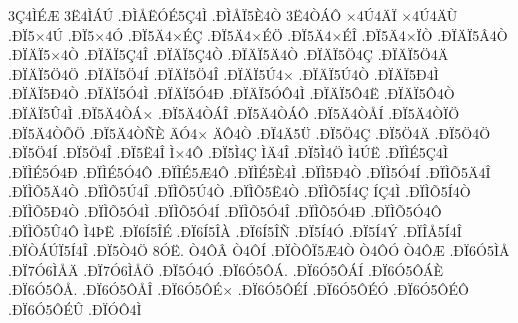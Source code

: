 {3^^c74^^cc^^c9^^c6
3^^cb4^^cc^^c1^^da
.^^d0^^cc^^c5^^cb^^d3^^c95^^c74^^cc
.^^d0^^cc^^c5^^cf5^^c84^^d2
3^^cb4^^d2^^c1^^d4
^^d74^^da4^^c4^^cf
^^d74^^da4^^c4^^d9
.^^d0^^cf5^^d74^^da
.^^d0^^cf5^^d74^^d3
.^^d0^^cf5^^c44^^d7^^c9^^c7
.^^d0^^cf5^^c44^^d7^^c9^^d6
.^^d0^^cf5^^c44^^d7^^c9^^ce
.^^d0^^cf5^^c44^^d7^^cf^^d2
.^^d0^^cf^^c4^^cf5^^c24^^d2
.^^d0^^cf^^c4^^cf5^^d74^^d2
.^^d0^^cf^^c4^^cf5^^c74^^ce
.^^d0^^cf^^c4^^cf5^^c74^^d2
.^^d0^^cf^^c4^^cf5^^c44^^d2
.^^d0^^cf^^c4^^cf5^^d64^^c7
.^^d0^^cf^^c4^^cf5^^d64^^c4
.^^d0^^cf^^c4^^cf5^^d64^^d6
.^^d0^^cf^^c4^^cf5^^d64^^cd
.^^d0^^cf^^c4^^cf5^^d64^^ce
.^^d0^^cf^^c4^^cf5^^da4^^d7
.^^d0^^cf^^c4^^cf5^^da4^^d2
.^^d0^^cf^^c4^^cf5^^d04^^cc
.^^d0^^cf^^c4^^cf5^^d04^^d2
.^^d0^^cf^^c4^^cf5^^d34^^cc
.^^d0^^cf^^c4^^cf5^^d34^^d0
.^^d0^^cf^^c4^^cf5^^d3^^d44^^cc
.^^d0^^cf^^c4^^cf5^^d44^^cb
.^^d0^^cf^^c4^^cf5^^d44^^d2
.^^d0^^cf^^c4^^cf5^^db4^^cc
.^^d0^^cf5^^c44^^d2^^c1^^d7
.^^d0^^cf5^^c44^^d2^^c1^^ce
.^^d0^^cf5^^c44^^d2^^c1^^d4
.^^d0^^cf5^^c44^^d2^^c5^^cd
.^^d0^^cf5^^c44^^d2^^cf^^d6
.^^d0^^cf5^^c44^^d2^^d5^^d6
.^^d0^^cf5^^c44^^d2^^d1^^c8
^^c4^^d34^^d7
^^c4^^d44^^d2
.^^d0^^cf4^^c45^^dc
.^^d0^^cf5^^d64^^c7
.^^d0^^cf5^^d64^^c4
.^^d0^^cf5^^d64^^d6
.^^d0^^cf5^^d64^^cd
.^^d0^^cf5^^d64^^ce
.^^d0^^cf5^^cb4^^ce
^^cc^^d74^^d4
.^^d0^^cf5^^cc4^^c7
^^cc^^c44^^ce
.^^d0^^cf5^^cc4^^d6
^^cc4^^da^^cb
.^^d0^^cf^^cc^^c95^^c74^^cc
.^^d0^^cf^^cc^^c95^^d34^^d0
.^^d0^^cf^^cc^^c95^^d34^^d4
.^^d0^^cf^^cc^^c95^^c64^^d4
.^^d0^^cf^^cc^^c95^^c84^^cc
.^^d0^^cf^^cc5^^d04^^d2
.^^d0^^cf^^cc5^^d34^^cd
.^^d0^^cf^^cc^^d55^^c44^^ce
.^^d0^^cf^^cc^^d55^^c44^^d2
.^^d0^^cf^^cc^^d55^^da4^^ce
.^^d0^^cf^^cc^^d55^^da4^^d2
.^^d0^^cf^^cc^^d55^^cb4^^d2
.^^d0^^cf^^cc^^d55^^cd4^^c7
^^cd^^c74^^cc
.^^d0^^cf^^cc^^d55^^cd4^^d2
.^^d0^^cf^^cc^^d55^^d04^^d2
.^^d0^^cf^^cc^^d55^^d34^^cc
.^^d0^^cf^^cc^^d55^^d34^^cd
.^^d0^^cf^^cc^^d55^^d34^^ce
.^^d0^^cf^^cc^^d55^^d34^^d0
.^^d0^^cf^^cc^^d55^^d34^^d4
.^^d0^^cf^^cc^^d55^^db4^^d4
^^cc4^^de^^cb
.^^d0^^cf6^^cd5^^ce^^c9
.^^d0^^cf6^^cd5^^ce^^c0
.^^d0^^cf6^^cd5^^ce^^d1
.^^d0^^cf5^^cd4^^d3
.^^d0^^cf5^^cd4^^dd
.^^d0^^cf^^ce^^c55^^cd4^^ce
.^^d0^^cf^^d2^^c1^^da^^cf5^^cd4^^ce
.^^d0^^cf5^^d24^^d6
8^^d3^^cb.
^^d24^^d4^^c2
^^d24^^d4^^cd
.^^d0^^cf^^d2^^d4^^cf5^^c64^^d2
^^d24^^d4^^d3
^^d24^^d4^^c6
.^^d0^^cf6^^d35^^cc^^c5
.^^d0^^cf7^^d36^^cc^^c5^^c4
.^^d0^^cf7^^d36^^cc^^c5^^d6
.^^d0^^cf5^^d34^^d3
.^^d0^^cf6^^d35^^d4^^c1.
.^^d0^^cf6^^d35^^d4^^c1^^cd
.^^d0^^cf6^^d35^^d4^^c1^^c8
.^^d0^^cf6^^d35^^d4^^c5.
.^^d0^^cf6^^d35^^d4^^c5^^ce
.^^d0^^cf6^^d35^^d4^^c9^^d7
.^^d0^^cf6^^d35^^d4^^c9^^cd
.^^d0^^cf6^^d35^^d4^^c9^^d3
.^^d0^^cf6^^d35^^d4^^c9^^d4
.^^d0^^cf6^^d35^^d4^^c9^^db
.^^d0^^cf^^d3^^d44^^cc
}
